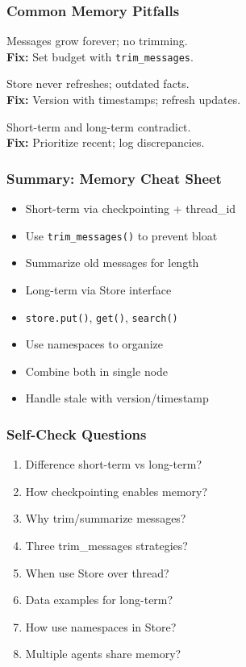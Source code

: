 \documentclass[aspectratio=169,11pt]{beamer}
\begin{document}
\begin{frame}
\frametitle{Common Memory Pitfalls}
\begin{warningbox}
Messages grow forever; no trimming.\\
\textbf{Fix:} Set budget with \texttt{trim\_messages}.
\end{warningbox}
\vspace{0.08cm}
\begin{warningbox}
Store never refreshes; outdated facts.\\
\textbf{Fix:} Version with timestamps; refresh updates.
\end{warningbox}
\vspace{0.08cm}
\begin{warningbox}[Conflicts]
Short-term and long-term contradict.\\
\textbf{Fix:} Prioritize recent; log discrepancies.
\end{warningbox}
\end{frame}

\begin{frame}
\frametitle{Summary: Memory Cheat Sheet}
\begin{conceptbox}
\setlength{\itemsep}{1pt}
\begin{itemize}
\item Short-term via checkpointing + thread\_id
\item Use \texttt{trim\_messages()} to prevent bloat
\item Summarize old messages for length
\item Long-term via Store interface
\item \texttt{store.put()}, \texttt{get()}, \texttt{search()}
\item Use namespaces to organize
\item Combine both in single node
\item Handle stale with version/timestamp
\end{itemize}
\end{conceptbox}
\end{frame}

\begin{frame}
\frametitle{Self-Check Questions}
\begin{enumerate}
\setlength{\itemsep}{2pt}
\item Difference short-term vs long-term?
\item How checkpointing enables memory?
\item Why trim/summarize messages?
\item Three trim\_messages strategies?
\item When use Store over thread?
\item Data examples for long-term?
\item How use namespaces in Store?
\item Multiple agents share memory?
\end{enumerate}
\end{frame}
\end{document}
